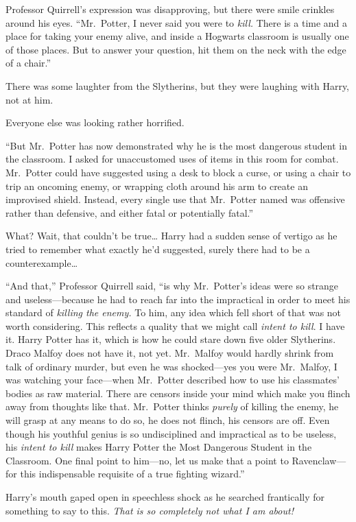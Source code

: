 Professor Quirrell's expression was disapproving, but there were smile
crinkles around his eyes. ``Mr.~Potter, I never said you were to
\emph{kill.} There is a time and a place for taking your enemy alive,
and inside a Hogwarts classroom is usually one of those places. But to
answer your question, hit them on the neck with the edge of a chair.''

There was some laughter from the Slytherins, but they were laughing with
Harry, not at him.

Everyone else was looking rather horrified.

``But Mr.~Potter has now demonstrated why he is the most dangerous
student in the classroom. I asked for unaccustomed uses of items in this
room for combat. Mr.~Potter could have suggested using a desk to block a
curse, or using a chair to trip an oncoming enemy, or wrapping cloth
around his arm to create an improvised shield. Instead, every single use
that Mr.~Potter named was offensive rather than defensive, and either
fatal or potentially fatal.''

What? Wait, that couldn't be true\ldots{} Harry had a sudden sense of
vertigo as he tried to remember what exactly he'd suggested, surely
there had to be a counterexample\ldots{}

``And that,'' Professor Quirrell said, ``is why Mr.~Potter's ideas were
so strange and useless---because he had to reach far into the
impractical in order to meet his standard of \emph{killing the enemy.}
To him, any idea which fell short of that was not worth considering.
This reflects a quality that we might call \emph{intent to kill}. I have
it. Harry Potter has it, which is how he could stare down five older
Slytherins. Draco Malfoy does not have it, not yet. Mr.~Malfoy would
hardly shrink from talk of ordinary murder, but even he was
shocked---yes you were Mr.~Malfoy, I was watching your face---when
Mr.~Potter described how to use his classmates' bodies as raw material.
There are censors inside your mind which make you flinch away from
thoughts like that. Mr.~Potter thinks \emph{purely} of killing the
enemy, he will grasp at any means to do so, he does not flinch, his
censors are off. Even though his youthful genius is so undisciplined and
impractical as to be useless, his \emph{intent to kill} makes Harry
Potter the Most Dangerous Student in the Classroom. One final point to
him---no, let us make that a point to Ravenclaw---for this indispensable
requisite of a true fighting wizard.''

Harry's mouth gaped open in speechless shock as he searched frantically
for something to say to this. \emph{That is so completely not what I am
about!}

